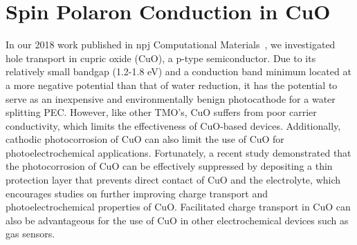 
\section{Spin Polaron Conduction in CuO}

In our 2018 work published in npj Computational Materials~\cite{smart2018mechanistic}, we investigated hole transport in cupric oxide (CuO), a p-type semiconductor. Due to its relatively small bandgap (1.2-1.8 eV) and a conduction band minimum located at a more negative potential than that of water reduction,
\cite{jang2015tree,koffyberg1982photoelectrochemical,chiang2012copper,izaki2011electrodeposition,sagu2014rapid,masudy2016nanocrystal,lee2016scalable,guo2014cuo,emin2014novel,septina2017stabilized}
it has the potential to serve as an inexpensive and environmentally benign photocathode for a water splitting PEC.
However, like other TMO's, CuO suffers from poor carrier conductivity, which limits the effectiveness of CuO-based devices.\cite{guo2014cuo,emin2014novel,wong2016current,masudy2016nanocrystal}
Additionally, cathodic photocorrosion of CuO can also limit the use of CuO for photoelectrochemical applications. Fortunately, a recent study demonstrated that the photocorrosion of CuO can be effectively suppressed by depositing a thin protection layer that prevents direct contact of CuO and the electrolyte,\cite{septina2017stabilized} which encourages studies on further improving charge transport and photoelectrochemical properties of CuO. Facilitated charge transport in CuO can also be advantageous for the use of CuO in other electrochemical devices such as gas sensors.\cite{poloju2018improved,rydosz2013nano}

